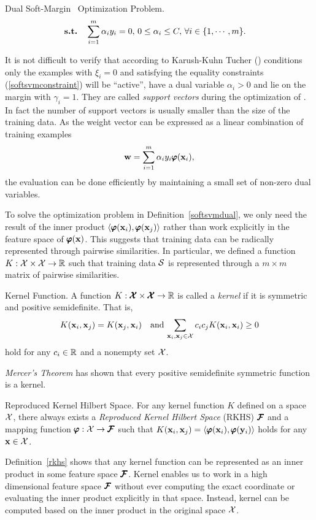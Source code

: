 {\begin{definition}{Dual Soft-Margin \svm\ Optimization Problem.}
\begin{align*}
		\textbf{s.t.} & \quad \sum_{i=1}^{m}\alpha_iy_i=0, \, 0\le\alpha_i\le C, \, \forall i\in\{1,\cdots,m\}.
	\end{align*}
\end{definition}
\noindent
It is not difficult to verify that according to Karush-Kuhn Tucher (\kkt) conditions only the examples with $\xi_i=0$ and satisfying the equality constraints (\ref{softsvmconstraint}) will be ``active'', have a dual variable $\alpha_i>0$ and lie on the margin with $\gamma_i=1$.
They are called \textit{support vectors} during the optimization of \svm.
In fact the number of support vectors is usually smaller than the size of the training data.
As the weight vector can be expressed as a linear combination of training examples \citep{taylor04}
\begin{align*}
	\mathbf {w} = \sum_{i=1}^{m}\alpha_iy_i\pmb \varphi(\mathbf {x}_i),
\end{align*}
the evaluation can be done efficiently by maintaining a small set of non-zero dual variables.

To solve the optimization problem in Definition~\ref{softsvmdual}, we only need the result of the inner product $\langle \pmb \varphi(\mathbf {x}_i), \pmb \varphi(\mathbf {x}_j) \rangle$ rather than work explicitly in the feature space of $\pmb \varphi(\mathbf {x})$.
This suggests that training data can be radically represented through pairwise similarities.
In particular, we defined a function $K:\mathcal{X}\times\mathcal{X}\rightarrow\mathbb{R}$ such that training data $\mathcal{S}$ is represented through a $m\times m$ matrix of pairwise similarities.
\begin{definition}{Kernel Function.}
 	A function $K:\pmb {\mathcal{X}}\times\pmb {\mathcal{X}}\rightarrow\mathbb{R}$ is called a \textit{kernel} if it is symmetric and positive semidefinite. That is, 
\begin{align*}
	K(\mathbf {x}_i,\mathbf {x}_j) = K(\mathbf {x}_j,\mathbf {x}_i)\quad \text{and}\, \sum_{\mathbf {x}_i,\mathbf {x}_j\in\mathcal{X}}c_ic_jK(\mathbf {x}_i,\mathbf {x}_i)\ge0
\end{align*}
hold for any $c_i\in\mathbb{R}$ and a nonempty set $\mathcal{X}$.
\end{definition}
\noindent
\textit{Mercer's Theorem} \citep{taylor04} has shown that every positive semidefinite symmetric function is a kernel.
\begin{definition}{Reproduced Kernel Hilbert Space.} \label{rkhs}
	For any kernel function $K$ defined on a space $\mathcal{X}$, there always exists a \textit{Reproduced Kernel Hilbert Space} (RKHS) $\pmb {\mathcal{F}}$ and a mapping function $\pmb \varphi:\mathcal{X}\rightarrow\pmb {\mathcal{F}}$ such that $K(\mathbf {x}_i,\mathbf {x}_j)=\langle \pmb \varphi(\mathbf {x}_i), \pmb \varphi(\mathbf {y}_i) \rangle$ holds for any $\mathbf {x}\in\mathcal{X}$.
\end{definition}
\noindent
Definition~\ref{rkhs} shows that any kernel function can be represented as an inner product in some feature space $\pmb {\mathcal{F}}$.
Kernel enables us to work in a high dimensional feature space $\pmb {\mathcal{F}}$ without ever computing the exact coordinate or evaluating the inner product explicitly in that space.
Instead, kernel can be computed based on the inner product in the original space $\mathcal{X}$.

}
